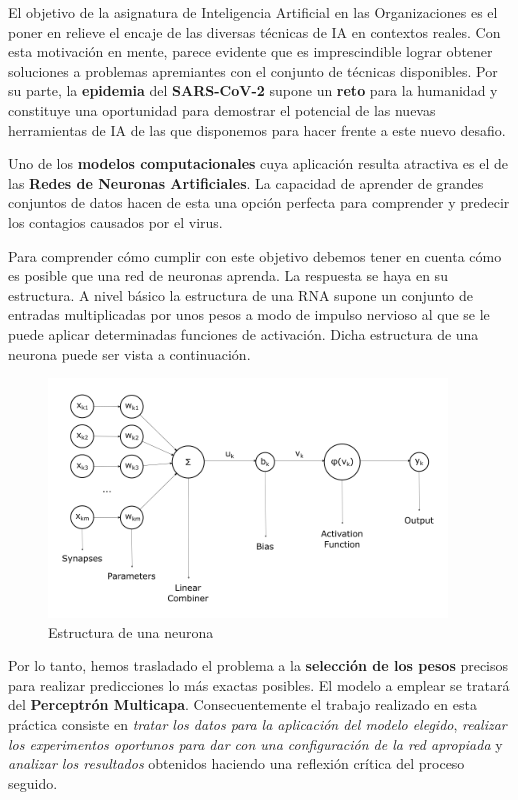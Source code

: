\documentclass[12pt,a4paper, xcolor=table]{article}
\begin{document}
  El objetivo de la asignatura de Inteligencia Artificial en las Organizaciones es el poner en relieve el encaje de las diversas técnicas de IA en contextos reales. Con esta motivación en mente, parece evidente que es imprescindible lograr obtener soluciones a problemas apremiantes con el conjunto de técnicas disponibles. Por su parte, la \textbf{epidemia} del\textbf{ SARS-CoV-2 }supone un \textbf{reto} para la humanidad y constituye una oportunidad para demostrar el potencial de las nuevas herramientas de IA de las que disponemos para hacer frente a este nuevo desafio.

  \vspace{3mm}

  Uno de los \textbf{modelos computacionales} cuya aplicación resulta atractiva es el de las \textbf{Redes de Neuronas Artificiales}. La capacidad de aprender de grandes conjuntos de datos hacen de esta una opción perfecta para comprender y predecir los contagios causados por el virus.

  \vspace{2mm}

  Para comprender cómo cumplir con este objetivo debemos tener en cuenta cómo es posible que una red de neuronas aprenda. La respuesta se haya en su estructura. A nivel básico la estructura de una RNA supone un conjunto de entradas multiplicadas por unos pesos a modo de impulso nervioso al que se le puede aplicar determinadas funciones de activación. Dicha estructura de una neurona puede ser vista a continuación.

  \begin{figure}[h]
      \centering
      \includegraphics[width=400px]{img/Neuron.png}
      \caption{Estructura de una neurona}
      \label{fig:graf_exp1}
  \end{figure}

  Por lo tanto, hemos trasladado el problema a la \textbf{selección de los pesos} precisos para realizar predicciones lo más exactas posibles. El modelo a emplear se tratará del \textbf{Perceptrón Multicapa}. Consecuentemente el trabajo realizado en esta práctica consiste en \textit{tratar los datos para la aplicación del modelo elegido}, \textit{realizar los experimentos oportunos para dar con una configuración de la red apropiada} y \textit{analizar los resultados} obtenidos haciendo una reflexión crítica del proceso seguido.
\end{document}
